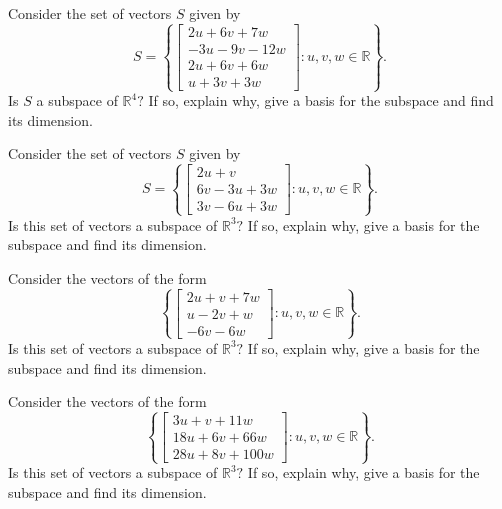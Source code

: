 \documentclass{ximera}
\begin{document}
\begin{problem}\label{prb:5.17} Consider the set of vectors $S$ given by
\begin{equation*}
S =
\left\{ \left[
\begin{array}{c}
2u+6v+7w \\
-3u-9v-12w \\
2u+6v+6w \\
u+3v+3w
\end{array}
\right] :u,v,w\in \mathbb{R}\right\} .
\end{equation*}
Is $S$ a subspace of $\mathbb{R}^{4}?$ If so, explain why,
give a basis for the subspace and find its dimension.
\end{problem}

\begin{problem}\label{prb:5.18} Consider the set of vectors $S$ given by
\begin{equation*}
S =
\left\{ \left[
\begin{array}{c}
2u+v \\
6v-3u+3w \\
3v-6u+3w
\end{array}
\right] :u,v,w\in \mathbb{R}\right\} .
\end{equation*}
Is this set of vectors a subspace of $\mathbb{R}^{3}?$ If so, explain why,
give a basis for the subspace and find its dimension.
\end{problem}

\begin{problem}\label{prb:5.19} Consider the vectors of the form
\begin{equation*}
\left\{ \left[
\begin{array}{c}
2u+v+7w \\
u-2v+w \\
-6v-6w
\end{array}
\right] :u,v,w\in \mathbb{R}\right\} .
\end{equation*}
Is this set of vectors a subspace of $\mathbb{R}^{3}?$ If so, explain why,
give a basis for the subspace and find its dimension.
\end{problem}

\begin{problem}\label{prb:5.20} Consider the vectors of the form
\begin{equation*}
\left\{ \left[
\begin{array}{c}
3u+v+11w \\
18u+6v+66w \\
28u+8v+100w
\end{array}
\right] :u,v,w\in \mathbb{R}\right\} .
\end{equation*}
Is this set of vectors a subspace of $\mathbb{R}^{3}?$ If so, explain why,
give a basis for the subspace and find its dimension.
\end{problem}
\end{document}
